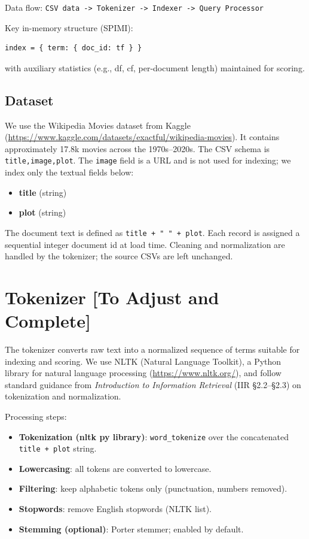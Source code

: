 \documentclass[11pt,a4paper]{article}
\begin{document}
Data flow:
\noindent\texttt{CSV data -> Tokenizer -> Indexer -> Query Processor}

Key in-memory structure (SPIMI):
\begin{verbatim}
index = { term: { doc_id: tf } }
\end{verbatim}
with auxiliary statistics (e.g., df, cf, per-document length) maintained for scoring.

\newpage
\subsection{Dataset}

We use the Wikipedia Movies dataset from Kaggle (\url{https://www.kaggle.com/datasets/exactful/wikipedia-movies}). It contains approximately 17.8k movies across the 1970s–2020s. The CSV schema is \texttt{title,image,plot}. The \texttt{image} field is a URL and is not used for indexing; we index only the textual fields below:
\begin{itemize}
    \item \textbf{title} (string)
    \item \textbf{plot} (string)
\end{itemize}

The document text is defined as \texttt{title + " " + plot}. Each record is assigned a sequential integer document id at load time. Cleaning and normalization are handled by the tokenizer; the source CSVs are left unchanged.

\section{Tokenizer [To Adjust and Complete]}
\label{sec:tokenizer}

The tokenizer converts raw text into a normalized sequence of terms suitable for indexing and scoring. We use NLTK (Natural Language Toolkit), a Python library for natural language processing (\url{https://www.nltk.org/}), and follow standard guidance from \textit{Introduction to Information Retrieval} (IIR \S2.2--\S2.3) on tokenization and normalization.

Processing steps:
\begin{itemize}
    \item \textbf{Tokenization (nltk py library)}: \texttt{word\_tokenize} over the concatenated \texttt{title + plot} string.
    \item \textbf{Lowercasing}: all tokens are converted to lowercase.
    \item \textbf{Filtering}: keep alphabetic tokens only (punctuation, numbers removed).
    \item \textbf{Stopwords}: remove English stopwords (NLTK list).
    \item \textbf{Stemming (optional)}: Porter stemmer; enabled by default.
\end{itemize}
\end{document}

